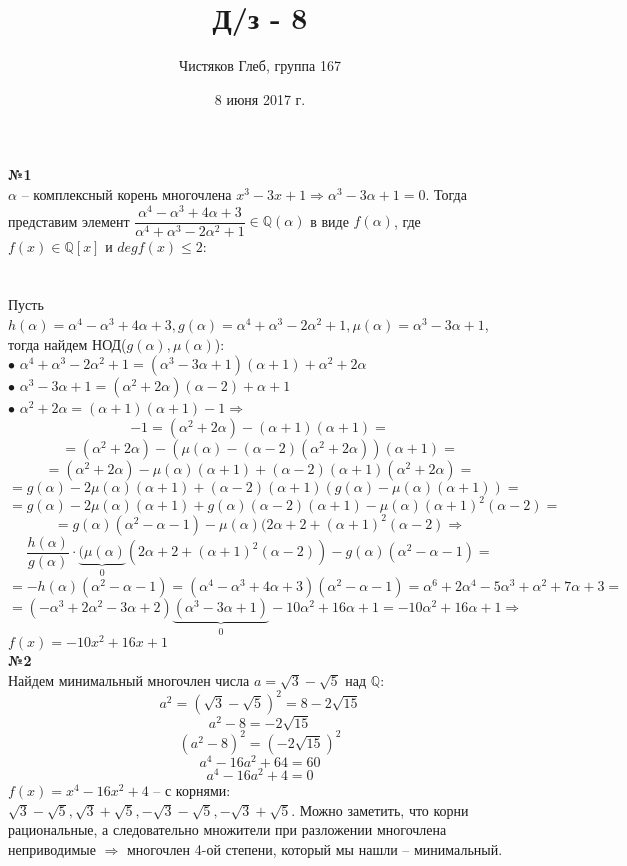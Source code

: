 \documentclass[a4paper, 12pt]{article}
\newcommand{\Q}{\mathbb{Q}}
\begin{document}
	\title{Д/з - 8}
	\author{Чистяков Глеб, группа 167}
	\date{8 июня 2017 г.}
	
	\maketitle
	
	\textbf{№1} \\
	
	$\alpha$ -- комплексный корень многочлена $x^3 - 3x + 1 \Rightarrow \alpha^3-3\alpha+1 = 0$. Тогда представим элемент $\dfrac{\alpha^4-\alpha^3+4\alpha+3}{\alpha^4+\alpha^3-2\alpha^2+1} \in \Q(\alpha)$ в виде $f(\alpha)$, где $f(x) \in\Q[x]$ и $degf(x) \leqslant 2$: \\\\\\
	Пусть $h(\alpha) = \alpha^4-\alpha^3+4\alpha+3, g(\alpha) = \alpha^4+\alpha^3-2\alpha^2+1, \mu(\alpha) = \alpha^3-3\alpha+1$, тогда найдем НОД($g(\alpha), \mu(\alpha)$): \\
	$\bullet$ $\alpha^4+\alpha^3-2\alpha^2+1 = (\alpha^3-3\alpha+1)(\alpha+1) + \alpha^2+2\alpha$ \\
	$\bullet$ $\alpha^3-3\alpha+1 = (\alpha^2+2\alpha)(\alpha-2) + \alpha+1$ \\
	$\bullet$ $\alpha^2+2\alpha = (\alpha+1)(\alpha+1) - 1 \Rightarrow$
	$$-1 = (\alpha^2+2\alpha)-(\alpha+1)(\alpha+1)=$$
	$$=(\alpha^2+2\alpha)-(\mu(\alpha)-(\alpha-2)(\alpha^2+2\alpha))(\alpha+1)=$$
	$$=(\alpha^2+2\alpha)-\mu(\alpha)(\alpha+1)+(\alpha-2)(\alpha+1)(\alpha^2+2\alpha)=$$
	$$=g(\alpha)-2\mu(\alpha)(\alpha+1)+(\alpha-2)(\alpha+1)(g(\alpha)-\mu(\alpha)(\alpha+1))=$$
	$$=g(\alpha)-2\mu(\alpha)(\alpha+1)+g(\alpha)(\alpha-2)(\alpha+1)-\mu(\alpha)(\alpha+1)^2(\alpha-2)=$$
	$$=g(\alpha)(\alpha^2-\alpha-1)-\mu(\alpha)(2\alpha+2+(\alpha+1)^2(\alpha-2) \Rightarrow$$
	$$\dfrac{h(\alpha)}{g(\alpha)}\cdot\underbrace{(\mu(\alpha)}_0(2\alpha+2+(\alpha+1)^2(\alpha-2))-g(\alpha)(\alpha^2-\alpha-1)=$$
	$$=-h(\alpha)(\alpha^2-\alpha-1)=(\alpha^4-\alpha^3+4\alpha+3)(\alpha^2-\alpha-1)=\alpha^6+2\alpha^4-5\alpha^3+\alpha^2+7\alpha+3 =$$ $$=(-\alpha^3+2\alpha^2-3\alpha+2)\underbrace{(\alpha^3-3\alpha+1)}_0-10\alpha^2+16\alpha+1 = -10\alpha^2+16\alpha+1 \Rightarrow$$
	$f(x) = -10x^2+16x+1$ \\
	
	\textbf{№2} \\
	
	Найдем минимальный многочлен числа $a = \sqrt{3} - \sqrt{5}$ над $\Q$:\\
	$$a^2 = (\sqrt{3} - \sqrt{5})^2 = 8 - 2\sqrt{15}$$
	$$a^2 - 8 = -2\sqrt{15}$$
	$$(a^2 - 8)^2 = (-2\sqrt{15})^2$$
	$$a^4 - 16a^2 + 64 = 60$$
	$$a^4 - 16a^2 + 4 = 0$$
	$f(x) = x^4 - 16x^2 + 4$ -- с корнями: $\sqrt{3} - \sqrt{5}, \sqrt{3} + \sqrt{5}, -\sqrt{3} - \sqrt{5}, -\sqrt{3} + \sqrt{5}$. Можно заметить, что корни рациональные, а следовательно множители при разложении многочлена неприводимые $\Rightarrow$ многочлен 4-ой степени, который мы нашли -- минимальный.\\
	
\end{document}
